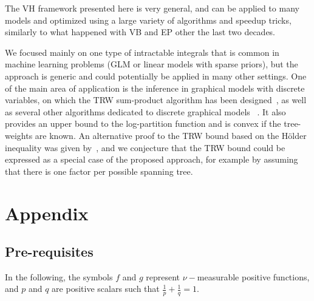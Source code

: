 \documentclass[reqno,oneside,letterpaper,10pt]{article}
\newcommand{\Holder}{H\"older\xspace}
\newcommand{\f}{f}
\newcommand{\g}{g}
\newcommand{\q}{q}
\def\p{p}
\begin{document}
The VH framework presented here is very general, and can be applied to many models and
optimized using a large variety of algorithms and speedup tricks, similarly to what happened 
with VB and EP other the last two decades. 

We focused mainly on one type of intractable integrals that is common in machine learning 
problems (GLM or linear models with sparse priors), but the approach is generic and
could potentially be applied in many other settings. One of the main area of application
is the inference in graphical models with discrete variables, on which the TRW sum-product
algorithm has been designed~\citep{wainwright2005new}, as well as several other
algorithms dedicated to discrete graphical models~ \citep{liu11d}. It also provides an upper bound to the log-partition function
and is convex if the tree-weights are known. An alternative proof to the TRW bound based on the \Holder inequality
was given by~\citet{minka2005divergence}, and we conjecture that the TRW bound could be 
expressed as a special case of the proposed approach, for example by assuming that there is 
one factor per possible spanning tree.



\newpage






\renewcommand{\f}{f}
\renewcommand{\g}{g}
\renewcommand{\p}{p}
\renewcommand{\q}{q}


\newpage
\vspace{-0.1in}
\section*{Appendix}
\vspace{-0.1in}
\subsection*{Pre-requisites}
In the following, the symbols $\f$ and $\g$ represent $\nu-$measurable positive functions, and $\p$ and $\q$ are positive  scalars such that $\frac 1\p+\frac 1\q=1$.
\end{document}
